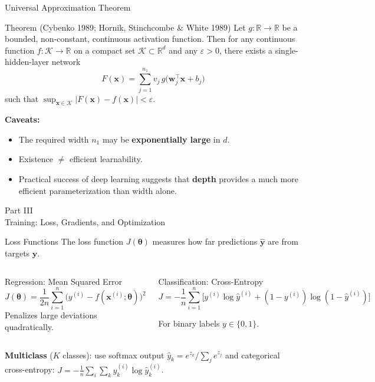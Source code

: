 \documentclass[aspectratio=169,11pt]{beamer}
\newcommand{\x}{\bm{x}}
\newcommand{\w}{\bm{w}}
\newcommand{\R}{\mathbb{R}}
\begin{document}
\begin{frame}{Universal Approximation Theorem}
\small
\begin{block}{Theorem (Cybenko 1989; Hornik, Stinchcombe \& White 1989)}
Let $g:\R\to\R$ be a bounded, non-constant, continuous activation function.  Then for any continuous function $f:\mathcal{K}\to\R$ on a compact set $\mathcal{K}\subset\R^d$ and any $\varepsilon>0$, there exists a single-hidden-layer network
\[
    F(\x) = \sum_{j=1}^{n_1} v_j\, g\!\big(\w_j^\top\x + b_j\big)
\]
such that $\sup_{\x\in\mathcal{K}} |F(\x) - f(\x)| < \varepsilon$.
\end{block}

\vspace{0.25cm}
\textbf{Caveats:}
\begin{itemize}\itemsep0pt
    \item The required width $n_1$ may be \textbf{exponentially large} in $d$.
    \item Existence $\neq$ efficient learnability.
    \item Practical success of deep learning suggests that \textbf{depth} provides a much more efficient parameterization than width alone.
\end{itemize}
\end{frame}
\begin{frame}{}
\begin{center}
{\Huge \textcolor{uzhblue}{Part III}}\\[0.8em]
{\LARGE Training: Loss, Gradients, and Optimization}
\end{center}
\end{frame}
\begin{frame}{Loss Functions}
The loss function $J(\bm{\theta})$ measures how far predictions $\hat{\bm{y}}$ are from targets $\bm{y}$.

\vspace{0.4cm}
\begin{columns}[T]
\begin{block}{Regression: Mean Squared Error}
\[
    J(\bm{\theta}) = \frac{1}{2n}\sum_{i=1}^{n}\big(y^{(i)} - f(\x^{(i)};\bm{\theta})\big)^{2}
\]
Penalizes large deviations quadratically.
\end{block}

\begin{block}{Classification: Cross-Entropy}
{\small
\[
    J = -\frac{1}{n}\sum_{i=1}^{n}\!\Big[y^{(i)}\!\log\hat{y}^{(i)} + (1{-}y^{(i)})\log(1{-}\hat{y}^{(i)})\Big]
\]}%
\vspace{-0.3cm}

For binary labels $y\in\{0,1\}$.
\end{block}
\end{columns}

\vspace{0.3cm}
\textbf{Multiclass} ($K$ classes): use softmax output $\hat{y}_k = e^{z_k}\big/\sum_j e^{z_j}$ and categorical cross-entropy:
$J = -\frac{1}{n}\sum_{i}\sum_{k} y_k^{(i)}\log \hat{y}_k^{(i)}$.
\end{frame}
\end{document}
